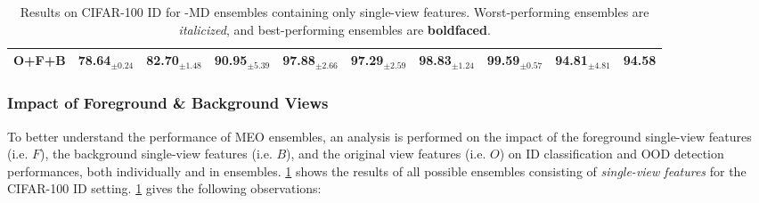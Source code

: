\begin{table}[tb]
{\begin{tabular}{|l|c|cccccccc|}
O+F+B & \textbf{78.64$_{\pm 0.24}$} & 82.70$_{\pm 1.48}$ & 90.95$_{\pm 5.39}$  &  \textbf{97.88$_{\pm 2.66}$} & \textbf{97.29$_{\pm 2.59}$} & \textbf{98.83$_{\pm 1.24}$} & 99.59$_{\pm 0.57}$ & \textbf{94.81$_{\pm 4.81}$}  & \multicolumn{1}{|c|}{\textbf{94.58}}      \\ \hline
\end{tabular}
}
\caption{Results on CIFAR-100 ID for \sysb-MD ensembles containing only single-view features. %
Worst-performing ensembles are \textit{italicized}, and best-performing ensembles are \textbf{boldfaced}.
}
\label{tab:propwork-meo-results-single-view_compare}
\end{table}

\subsubsection{Impact of Foreground \& Background Views}
To better understand the performance of MEO ensembles, an analysis is performed on the impact of the foreground single-view features (i.e. $F$), the background single-view features (i.e. $B$), and the original view features (i.e. $O$) on ID classification and OOD detection performances, both individually and in ensembles. \ref{tab:propwork-meo-results-single-view_compare} shows the results of all possible ensembles consisting of \textit{single-view features} for the CIFAR-100 ID setting. \ref{tab:propwork-meo-results-single-view_compare} gives the following observations: %
